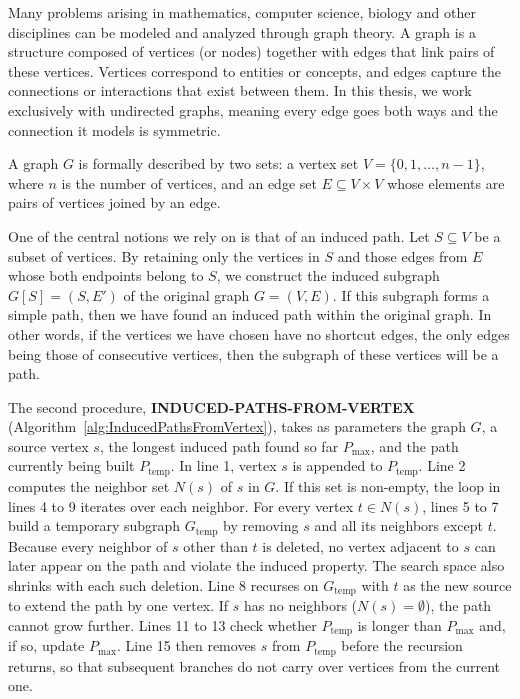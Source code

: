 Many problems arising in mathematics, computer science, biology and other disciplines can be modeled and analyzed through graph theory. A graph is a structure composed of vertices (or nodes) together with edges that link pairs of these vertices. Vertices correspond to entities or concepts, and edges capture the connections or interactions that exist between them. In this thesis, we work exclusively with undirected graphs, meaning every edge goes both ways and the connection it models is symmetric.

\par A graph $G$ is formally described by two sets: a vertex set $V = \{0, 1, \ldots, n - 1\}$, where $n$ is the number of vertices, and an edge set $E \subseteq V \times V$ whose elements are pairs of vertices joined by an edge.

\par One of the central notions we rely on is that of an induced path. Let $S \subseteq V$ be a subset of vertices. By retaining only the vertices in $S$ and those edges from $E$ whose both endpoints belong to $S$, we construct the induced subgraph $G[S] = (S, E')$ of the original graph $G = (V, E)$. If this subgraph forms a simple path, then we have found an induced path within the original graph. In other words, if the vertices we have chosen have no shortcut edges, the only edges being those of consecutive vertices, then the subgraph of these vertices will be a path.

The second procedure, \textbf{INDUCED-PATHS-FROM-VERTEX} (Algorithm~\ref{alg:InducedPathsFromVertex}), takes as parameters the graph \( G \), a source vertex \( s \), the longest induced path found so far \( P_\text{max} \), and the path currently being built \( P_\text{temp} \). In line 1, vertex \( s \) is appended to \( P_\text{temp} \). Line 2 computes the neighbor set \( N(s) \) of \( s \) in \( G \). If this set is non-empty, the loop in lines 4 to 9 iterates over each neighbor. For every vertex \( t \in N(s) \), lines 5 to 7 build a temporary subgraph \( G_\text{temp} \) by removing \( s \) and all its neighbors except \( t \). Because every neighbor of \( s \) other than \( t \) is deleted, no vertex adjacent to \( s \) can later appear on the path and violate the induced property. The search space also shrinks with each such deletion. Line 8 recurses on \( G_\text{temp} \) with \( t \) as the new source to extend the path by one vertex. If \( s \) has no neighbors (\( N(s) = \emptyset \)), the path cannot grow further. Lines 11 to 13 check whether \( P_\text{temp} \) is longer than \( P_\text{max} \) and, if so, update \( P_\text{max} \). Line 15 then removes \( s \) from \( P_\text{temp} \) before the recursion returns, so that subsequent branches do not carry over vertices from the current one.
